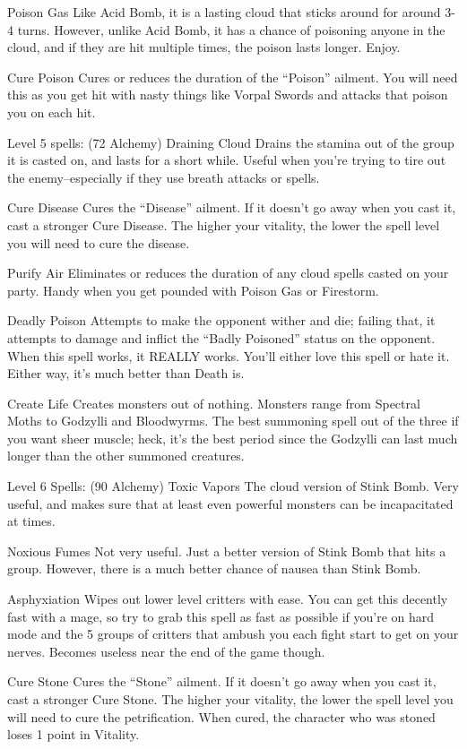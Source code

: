 \documentclass[12pt]{article}
\begin{document}
Poison Gas Like Acid Bomb, it is a lasting cloud that sticks around for
around 3-4 turns. However, unlike Acid Bomb, it has a chance of
poisoning anyone in the cloud, and if they are hit multiple times, the
poison lasts longer. Enjoy.

Cure Poison Cures or reduces the duration of the ``Poison'' ailment. You
will need this as you get hit with nasty things like Vorpal Swords and
attacks that poison you on each hit.

Level 5 spells: (72 Alchemy) Draining Cloud Drains the stamina out of
the group it is casted on, and lasts for a short while. Useful when
you're trying to tire out the enemy--especially if they use breath
attacks or spells.

Cure Disease Cures the ``Disease'' ailment. If it doesn't go away when
you cast it, cast a stronger Cure Disease. The higher your vitality, the
lower the spell level you will need to cure the disease.

Purify Air Eliminates or reduces the duration of any cloud spells casted
on your party. Handy when you get pounded with Poison Gas or Firestorm.

Deadly Poison Attempts to make the opponent wither and die; failing
that, it attempts to damage and inflict the ``Badly Poisoned'' status on
the opponent. When this spell works, it REALLY works. You'll either love
this spell or hate it. Either way, it's much better than Death is.

Create Life Creates monsters out of nothing. Monsters range from
Spectral Moths to Godzylli and Bloodwyrms. The best summoning spell out
of the three if you want sheer muscle; heck, it's the best period since
the Godzylli can last much longer than the other summoned creatures.

Level 6 Spells: (90 Alchemy) Toxic Vapors The cloud version of Stink
Bomb. Very useful, and makes sure that at least even powerful monsters
can be incapacitated at times.

Noxious Fumes Not very useful. Just a better version of Stink Bomb that
hits a group. However, there is a much better chance of nausea than
Stink Bomb.

Asphyxiation Wipes out lower level critters with ease. You can get this
decently fast with a mage, so try to grab this spell as fast as possible
if you're on hard mode and the 5 groups of critters that ambush you each
fight start to get on your nerves. Becomes useless near the end of the
game though.

Cure Stone Cures the ``Stone'' ailment. If it doesn't go away when you
cast it, cast a stronger Cure Stone. The higher your vitality, the lower
the spell level you will need to cure the petrification. When cured, the
character who was stoned loses 1 point in Vitality.
\end{document}
